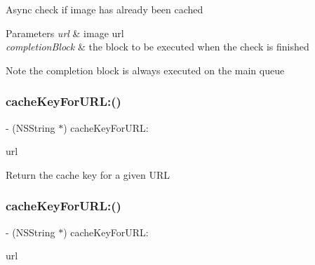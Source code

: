 Async check if image has already been cached


\begin{DoxyParams}{Parameters}
{\em url} & image url \\
\hline
{\em completion\+Block} & the block to be executed when the check is finished\\
\hline
\end{DoxyParams}
\begin{DoxyNote}{Note}
the completion block is always executed on the main queue 
\end{DoxyNote}
\mbox{\label{interface_s_d_web_image_manager_a6f02c3f166329cdc53553621a7f8c04a}} 
\subsubsection{\texorpdfstring{cache\+Key\+For\+U\+R\+L\+:()}{cacheKeyForURL:()}\hspace{0.1cm}{\footnotesize\ttfamily [1/3]}}
{\footnotesize\ttfamily -\/ (N\+S\+String $\ast$) cache\+Key\+For\+U\+R\+L\+: \begin{DoxyParamCaption}\item[{(N\+S\+U\+RL $\ast$)}]{url }\end{DoxyParamCaption}}

Return the cache key for a given U\+RL \mbox{\label{interface_s_d_web_image_manager_a6f02c3f166329cdc53553621a7f8c04a}} 
\subsubsection{\texorpdfstring{cache\+Key\+For\+U\+R\+L\+:()}{cacheKeyForURL:()}\hspace{0.1cm}{\footnotesize\ttfamily [2/3]}}
{\footnotesize\ttfamily -\/ (N\+S\+String $\ast$) cache\+Key\+For\+U\+R\+L\+: \begin{DoxyParamCaption}\item[{(N\+S\+U\+RL $\ast$)}]{url }\end{DoxyParamCaption}}

